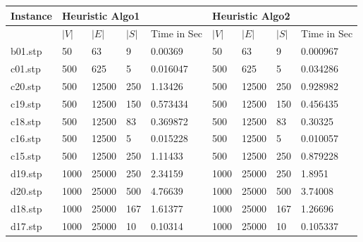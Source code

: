 \begin{table}[H]
\label{my-label}
\begin{center}
\begin{tabular}{|l|l|l|l|l|l|l|l|l|}
\hline
Instance & \multicolumn{4}{l|}{Heuristic Algo1} & \multicolumn{4}{l|}{Heuristic Algo2} \\ \hline
         & $|V|$      & $|E|$      & $|S|$      & Time in Sec     & $|V|$      & $|E|$      & $|S|$     & Time in Sec    \\ \hline
     b01.stp    &  50       &    63      &     9   &  0.00369       &  50       &    63      &     9    & 0.000967        \\ \hline
     c01.stp    &  500      &    625     &     5   &  0.016047      &  500      &    625     &     5    &  0.034286    \\ \hline
     c20.stp    &  500      &   12500    &     250   &  1.13426     &  500      &   12500    &     250  &  0.928982 \\ \hline

     c19.stp    &  500      &   12500    &     150   &  0.573434      &  500       &   12500    &     150   &  0.456435 \\ \hline
     c18.stp    &  500      &   12500    &     83    &  0.369872       &  500      &   12500    &     83    &  0.30325 \\ \hline

     c16.stp    &  500      &   12500    &     5   &  0.015228      &  500      &   12500    &     5    &  0.010057 \\ \hline

     c15.stp    &  500      &   12500    &     250   &  1.11433      &  500      &   12500    &     250   &  0.879228 \\ \hline
    
     d19.stp    &  1000      &   25000    &     250   &  2.34159      &  1000      &   25000    &     250   &  1.8951 \\ \hline
     d20.stp    &  1000      &   25000    &     500   &  4.76639      &  1000      &   25000    &     500   &  3.74008 \\ \hline
     d18.stp    &  1000      &   25000    &     167   &  1.61377      &  1000      &   25000     &     167   &  1.26696 \\ \hline
     d17.stp    &  1000      &   25000    &     10    &  0.10314       &  1000      &   25000    &      10   &  0.105337 \\ \hline
     

\end{tabular}
\end{center}
\end{table}
